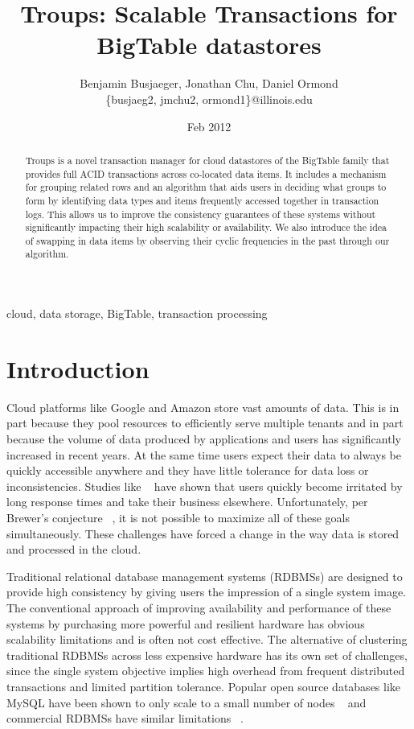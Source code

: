 \documentclass[10pt,final,journal]{IEEEtran}
\begin{document}
\title{Troups: Scalable Transactions for BigTable datastores}
\author{Benjamin Busjaeger, Jonathan Chu, Daniel Ormond \\
\{busjaeg2, jmchu2, ormond1\}@illinois.edu}
\date{Feb 2012}
\maketitle

\begin{abstract}
Troups is a novel transaction manager for cloud datastores of the BigTable family that provides full ACID transactions across co-located data items. It includes a mechanism for grouping related rows and an algorithm that aids users in deciding what groups to form by identifying data types and items frequently accessed together in transaction logs. This allows us to improve the consistency guarantees of these systems without significantly impacting their high scalability or availability. We also introduce the idea of swapping in data items by observing their cyclic frequencies in the past through our algorithm.
\end{abstract}

\begin{IEEEkeywords}
cloud, data storage, BigTable, transaction processing
\end{IEEEkeywords}

\section{Introduction}
Cloud platforms like Google and Amazon store vast amounts of data. This is in part because they pool resources to efficiently serve multiple tenants and in part because the volume of data produced by applications and users has significantly increased in recent years. At the same time users expect their data to always be quickly accessible anywhere and they have little tolerance for data loss or inconsistencies. Studies like ~\cite{Ramsay:1998} have shown that users quickly become  irritated by long response times and take their business elsewhere. Unfortunately, per Brewer's conjecture ~\cite{gilbert2002brewer}, it is not possible to maximize all of these goals simultaneously. These challenges have forced a change in the way data is stored and processed in the cloud.

Traditional relational database management systems (RDBMSs) are designed to provide high consistency by giving users the impression of a single system image. The conventional approach of improving availability and performance of these systems by purchasing more powerful and resilient hardware has obvious scalability limitations and is often not cost effective. The alternative of clustering traditional RDBMSs across less expensive hardware has its own set of challenges, since the single system objective implies high overhead from frequent distributed transactions and limited partition tolerance. Popular open source databases like MySQL have been shown to only scale to a small number of nodes ~\cite{Malkowski:2010:EAD:1774088.1774449} and commercial RDBMSs have similar limitations ~\cite{Campbell:2010:ESF:1807167.1807280}.
\end{document}
